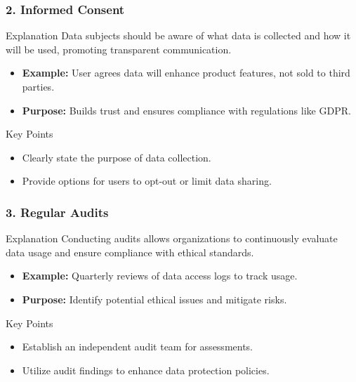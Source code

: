 \documentclass[aspectratio=169]{beamer}
\begin{document}
\begin{frame}[fragile]
    \frametitle{2. Informed Consent}
    \begin{block}{Explanation}
        Data subjects should be aware of what data is collected and how it will be used, promoting transparent communication.
    \end{block}
    \begin{itemize}
        \item \textbf{Example:} User agrees data will enhance product features, not sold to third parties.
        \item \textbf{Purpose:} Builds trust and ensures compliance with regulations like GDPR.
    \end{itemize}
    \begin{block}{Key Points}
        \begin{itemize}
            \item Clearly state the purpose of data collection.
            \item Provide options for users to opt-out or limit data sharing.
        \end{itemize}
    \end{block}
\end{frame}

\begin{frame}[fragile]
    \frametitle{3. Regular Audits}
    \begin{block}{Explanation}
        Conducting audits allows organizations to continuously evaluate data usage and ensure compliance with ethical standards.
    \end{block}
    \begin{itemize}
        \item \textbf{Example:} Quarterly reviews of data access logs to track usage.
        \item \textbf{Purpose:} Identify potential ethical issues and mitigate risks.
    \end{itemize}
    \begin{block}{Key Points}
        \begin{itemize}
            \item Establish an independent audit team for assessments.
            \item Utilize audit findings to enhance data protection policies.
        \end{itemize}
    \end{block}
\end{frame}
\end{document}
